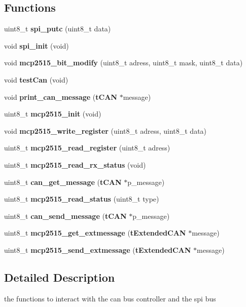 \subsection*{\-Functions}
\begin{DoxyCompactItemize}
\item 
uint8\-\_\-t {\bfseries spi\-\_\-putc} (uint8\-\_\-t data)\label{group__can_gac4133801d9adaaf42e7a43018c159127}

\item 
void {\bfseries spi\-\_\-init} (void)\label{mcp2515_8c_ae909944aa85ae98323073c628be541aa}

\item 
void {\bfseries mcp2515\-\_\-bit\-\_\-modify} (uint8\-\_\-t adress, uint8\-\_\-t mask, uint8\-\_\-t data)\label{group__can_ga29ca95ce06b46820080e6bf39aca3f5d}

\item 
void {\bfseries test\-Can} (void)\label{group__can_gaff8c7fc3028fe24b6a3dfc003054d3eb}

\item 
void {\bfseries print\-\_\-can\-\_\-message} ({\bf t\-C\-A\-N} $\ast$message)\label{group__can_ga52abe12031912f44f79fe7e6af042d1b}

\item 
uint8\-\_\-t {\bfseries mcp2515\-\_\-init} (void)\label{group__can_ga7be3d201a4dda59f8a16898c935c2b39}

\item 
void {\bfseries mcp2515\-\_\-write\-\_\-register} (uint8\-\_\-t adress, uint8\-\_\-t data)\label{group__can_gaf18f4716d0060c65756daf517d339968}

\item 
uint8\-\_\-t {\bfseries mcp2515\-\_\-read\-\_\-register} (uint8\-\_\-t adress)\label{group__can_ga9f78b3c42a3e8039350f2332aacef2b9}

\item 
uint8\-\_\-t {\bfseries mcp2515\-\_\-read\-\_\-rx\-\_\-status} (void)\label{mcp2515_8c_a164ed93db39889e151cd8521cec2c8d4}

\item 
uint8\-\_\-t {\bfseries can\-\_\-get\-\_\-message} ({\bf t\-C\-A\-N} $\ast$p\-\_\-message)\label{group__can_ga0926474bc6315f1d7d9d81492629e6ca}

\item 
uint8\-\_\-t {\bfseries mcp2515\-\_\-read\-\_\-status} (uint8\-\_\-t type)\label{group__can_gab3e48a42131e0f03105ed354041bbdba}

\item 
uint8\-\_\-t {\bfseries can\-\_\-send\-\_\-message} ({\bf t\-C\-A\-N} $\ast$p\-\_\-message)\label{group__can_gac0bc127d4f90b38d86aa09297379697b}

\item 
uint8\-\_\-t {\bfseries mcp2515\-\_\-get\-\_\-extmessage} ({\bf t\-Extended\-C\-A\-N} $\ast$message)\label{group__can_ga8119e51b53388c64e3bdd771bd9ab642}

\item 
uint8\-\_\-t {\bfseries mcp2515\-\_\-send\-\_\-extmessage} ({\bf t\-Extended\-C\-A\-N} $\ast$message)\label{group__can_ga3efadd966e76741e5e8f711e9bc7ed9d}

\end{DoxyCompactItemize}


\subsection{\-Detailed \-Description}
the functions to interact with the can bus controller and the spi bus 